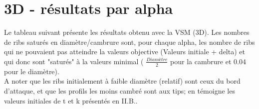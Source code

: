 \section{3D - résultats par alpha}
\label{sec:Ch3.3}

Le tableau suivant présente les résultats obtenu avec la VSM (3D). Les nombres de ribs saturés en diamètre/cambrure sont, pour chaque alpha, les nombre de ribs qui ne pouvaient pas atteindre la valeurs objective (Valeurs initiale + delta) et qui donc sont "saturés" à la valeurs minimal ( $\frac{Diamètre}{2}$ pour la cambrure et 0.04 pour le diamètre).\\

A noter que les ribs initialement à faible diamètre (relatif) sont ceux du bord d'attaque, et que les profils les moins cambré sont aux tips; en témoigne les valeurs initiales de t et k présentés en II.B..

